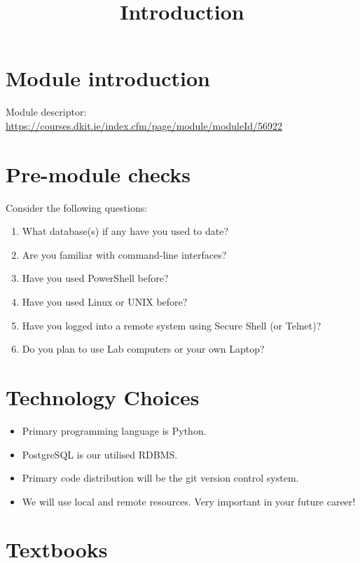 \documentclass[slides]{pgnotes}
\title{Introduction}
\begin{document}
\maketitle

\section{Module introduction}

Module descriptor:\\
\url{https://courses.dkit.ie/index.cfm/page/module/moduleId/56922}


\section{Pre-module checks}

Consider the following questions: 

\begin{enumerate}
\item What database(s) if any have you used to date?
\item Are you familiar with command-line interfaces?
\item Have you used PowerShell before?
\item Have you used Linux or UNIX before?
\item Have you logged into a remote system using Secure Shell (or Telnet)?
\item Do you plan to use Lab computers or your own Laptop? 
\end{enumerate}


\section{Technology Choices}

\begin{itemize}
\item Primary programming language is Python.
\item PostgreSQL is our utilised RDBMS.
\item Primary code distribution will be the git version control system.
\item We will use local and remote resources. Very important in your future career!
\end{itemize}


\section{Textbooks}
\end{document}
